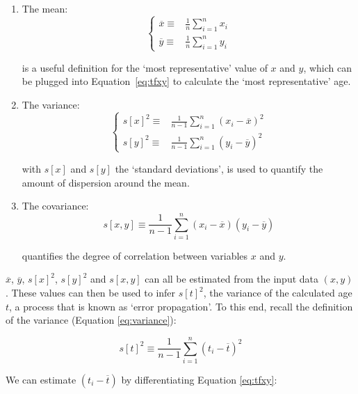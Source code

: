 \begin{enumerate}
\item The mean:
\begin{equation}
\left\{
\begin{array}{rl}
\overline{x} \equiv & \frac{1}{n} \sum_{i=1}^{n} x_i\\
\overline{y} \equiv & \frac{1}{n} \sum_{i=1}^{n} y_i
\end{array}
\right.
\label{eq:mean}
\end{equation}

is a useful definition for the `most representative' value of $x$ and
$y$, which can be plugged into Equation~\ref{eq:tfxy} to calculate the
`most representative' age.

\item The variance:
\begin{equation}
\left\{
\begin{array}{rl}
s[x]^2 \equiv & \frac{1}{n-1} \sum_{i=1}^{n} (x_i-\overline{x})^2\\
s[y]^2 \equiv & \frac{1}{n-1} \sum_{i=1}^{n} (y_i-\overline{y})^2
\end{array}
\right.
\label{eq:variance}
\end{equation}

with $s[x]$ and $s[y]$ the `standard deviations', is used to quantify
the amount of dispersion around the mean.

\item The covariance:
\begin{equation}
s[x,y] \equiv \frac{1}{n-1} \sum_{i=1}^{n} (x_i-\overline{x})(y_i-\overline{y})
\label{eq:covariance}
\end{equation}

quantifies the degree of correlation between variables $x$ and $y$.
\end{enumerate}

$\overline{x}$, $\overline{y}$, $s[x]^2$, $s[y]^2$ and $s[x,y]$ can
all be estimated from the input data $(x,y)$. These values can then be
used to infer $s[t]^2$, the variance of the calculated age $t$, a
process that is known as `error propagation'. To this end, recall the
definition of the variance (Equation \ref{eq:variance}):

\begin{equation}
s[t]^2 \equiv \frac{1}{n-1} \sum_{i=1}^{n} (t_i-\overline{t})^2
\label{eq:vart}
\end{equation}

We can estimate $(t_i-\overline{t})$ by differentiating Equation
\ref{eq:tfxy}:

